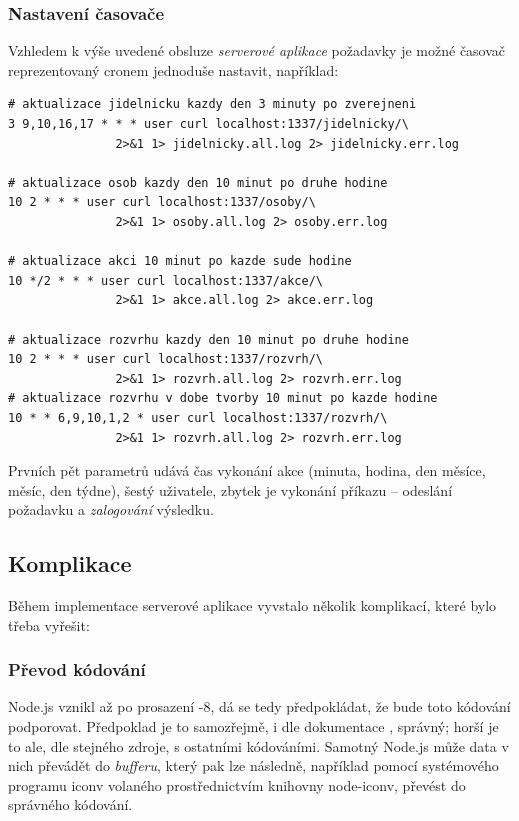 \subsubsection{Nastavení časovače}
Vzhledem k výše uvedené obsluze \textit{serverové aplikace}  požadavky je možné časovač reprezentovaný cronem jednoduše nastavit, například:
\begin{verbatim}
# aktualizace jidelnicku kazdy den 3 minuty po zverejneni
3 9,10,16,17 * * * user curl localhost:1337/jidelnicky/\
               2>&1 1> jidelnicky.all.log 2> jidelnicky.err.log

# aktualizace osob kazdy den 10 minut po druhe hodine
10 2 * * * user curl localhost:1337/osoby/\
               2>&1 1> osoby.all.log 2> osoby.err.log

# aktualizace akci 10 minut po kazde sude hodine
10 */2 * * * user curl localhost:1337/akce/\
               2>&1 1> akce.all.log 2> akce.err.log

# aktualizace rozvrhu kazdy den 10 minut po druhe hodine
10 2 * * * user curl localhost:1337/rozvrh/\
               2>&1 1> rozvrh.all.log 2> rozvrh.err.log
# aktualizace rozvrhu v dobe tvorby 10 minut po kazde hodine
10 * * 6,9,10,1,2 * user curl localhost:1337/rozvrh/\
               2>&1 1> rozvrh.all.log 2> rozvrh.err.log
\end{verbatim}
Prvních pět parametrů udává čas vykonání akce (minuta, hodina, den měsíce, měsíc, den týdne), šestý uživatele, zbytek je vykonání příkazu -- odeslání požadavku a \textit{zalogování} výsledku.


\subsection{Komplikace}
Během implementace serverové aplikace vyvstalo několik komplikací, které bylo třeba vyřešit:

\subsubsection{Převod kódování}
Node.js vznikl až po prosazení -8, dá se tedy předpokládat, že bude toto kódování podporovat. Předpoklad je to samozřejmě, i dle dokumentace \cite{NodeEncoding}, správný; horší je to ale, dle stejného zdroje, s ostatními kódováními. Samotný Node.js může data v nich převádět do \textit{bufferu}, který pak lze následně, například pomocí systémového programu iconv volaného prostřednictvím knihovny node-iconv, převést do správného kódování.

